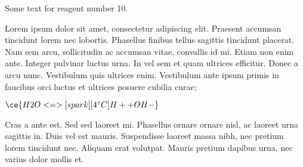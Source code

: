 
Some text for reagent number 10.

Lorem ipsum dolor sit amet, consectetur adipiscing elit. Praesent accumsan tincidunt lorem nec lobortis. Phasellus finibus tellus sagittis tincidunt placerat. Nam sem arcu, sollicitudin ac accumsan vitae, convallis id mi. Etiam non enim ante. Integer pulvinar luctus urna. In vel sem et quam ultrices efficitur. Donec a arcu nunc. Vestibulum quis ultrices enim. Vestibulum ante ipsum primis in faucibus orci luctus et ultrices posuere cubilia curae;

$\ce{H2O <=>[spark][4^\circ C] H+ + OH-}$

Cras a ante est. Sed sed laoreet mi. Phasellus ornare ornare nisl, ac laoreet urna sagittis in. Duis vel est mauris. Suspendisse laoreet massa nibh, nec pretium lorem tincidunt nec. Aliquam erat volutpat. Mauris pretium dapibus urna, nec varius dolor mollis et.
